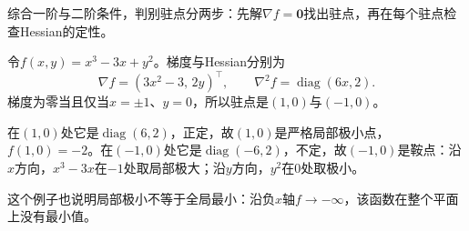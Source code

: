 综合一阶与二阶条件，判别驻点分两步：先解$\nabla f=\bm 0$找出驻点，再在每个驻点检查Hessian的定性。
\begin{example}[驻点的分类]
\label{ex:multivariable-stationary-point-classification}
令$f(x,y)=x^3-3x+y^2$。梯度与Hessian分别为
\[
 \nabla f=(3x^2-3,\,2y)^\top,\qquad\nabla^2f=\operatorname{diag}(6x,2).
\]
梯度为零当且仅当$x=\pm1$、$y=0$，所以驻点是$(1,0)$与$(-1,0)$。

在$(1,0)$处它是$\operatorname{diag}(6,2)$，正定，故$(1,0)$是严格局部极小点，$f(1,0)=-2$。在$(-1,0)$处它是$\operatorname{diag}(-6,2)$，不定，故$(-1,0)$是鞍点：沿$x$方向，$x^3-3x$在$-1$处取局部极大；沿$y$方向，$y^2$在$0$处取极小。
\end{example}

这个例子也说明局部极小不等于全局最小：沿负$x$轴$f\to-\infty$，该函数在整个平面上没有最小值。
